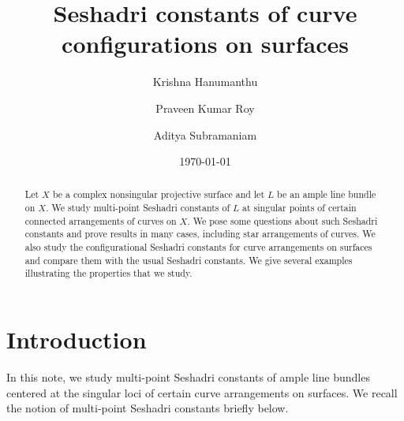 \documentclass[12pt,reqno]{amsart}
\theoremstyle{plain}
\numberwithin{equation}{section}
\theoremstyle{definition}
\begin{document}
	\title[Seshadri constants  of curve configurations on surfaces]{Seshadri constants  of curve configurations on surfaces}
	\author[K. Hanumanthu]{Krishna Hanumanthu}

\address{Chennai Mathematical Institute, H1 SIPCOT IT Park, Siruseri, Kelambakkam 603103,
India.}


\author[P. K. Roy]{Praveen Kumar Roy}

\address{UM-DAE Centre for Excellence in Basic Sciences, University of Mumbai Santacruz, Mumbai 400098, India}


\author[A. Subramaniam]{Aditya Subramaniam}

\address{Indian Institute of Science Education and Research Tirupati, Rami Reddy Nagar, Karakambadi Road, Mangalam (P.O.),
Tirupati, Andhra Pradesh, INDIA – 517507.}



\date{\today}

	\begin{abstract}
	Let $X$ be a complex nonsingular projective surface and let $L$ be an ample line bundle on $X$. We study multi-point Seshadri constants of $L$ at singular points of certain connected arrangements of curves on $X$. We pose some questions about such Seshadri constants and prove results in many cases, including star arrangements of curves. We also study the configurational Seshadri constants for curve arrangements on surfaces and compare them with the usual Seshadri constants. We give several examples illustrating the properties that we study. 
	\end{abstract}
	
		\maketitle

	
	\section{Introduction}
	In this note, we study multi-point Seshadri constants of ample line bundles centered at the singular loci of certain curve arrangements on surfaces. We recall the notion of  multi-point Seshadri constants briefly below. 
	
\end{document}
